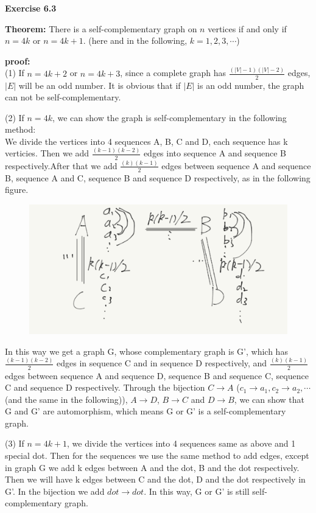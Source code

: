 \documentclass{article} %
\begin{document}
	\textbf{Exercise 6.3}\par
	\textbf{Theorem:}  There is a self-complementary graph on $n$ vertices if and only if $n=4k$ or $n=4k+1$. (here and in the following, $k=1,2,3,\cdots$)\par
	\textbf{proof:}\\
	(1)  If $n=4k+2$ or $n=4k+3$, since a complete graph has $\frac{(|V|-1)(|V|-2)}{2}$ edges, $|E|$ will be an odd number. It is obvious that if $|E|$ is an odd number, the graph can not be self-complementary.\par
	(2)  If $n=4k$, we can show the graph is self-complementary in the following method:\\
	We divide the vertices into 4 sequences A, B, C and D, each sequence has k verticies. Then we add $\frac{(k-1)(k-2)}{2}$ edges into sequence A and sequence B respectively.After that we add $\frac{(k)(k-1)}{2}$ edges between sequence A and sequence B, sequence A and C, sequence B and sequence D respectively, as in the following figure. 
	\begin{figure}[H]
		\centering
		\includegraphics[scale=0.8]{p1.png}
		\caption{}
		\label{fig:4}
	\end{figure}

	In this way we get a graph G, whose complementary graph is G', which has $\frac{(k-1)(k-2)}{2}$ edges in sequence C and in sequence D respectively, and $\frac{(k)(k-1)}{2}$ edges between sequence A and sequence D, sequence B and sequence C, sequence C and sequence D respectively. Through the bijection $C\rightarrow A$ ($c_1\rightarrow a_1, c_2\rightarrow a_2,\cdots$ (and the same in the following)), $A\rightarrow D$, $B\rightarrow C$ and $D\rightarrow B$, we can show that G and G' are automorphism, which means G or G' is a self-complementary graph.\par
	(3)  If $n=4k+1$, we divide the vertices into 4 sequences same as above and 1 special dot. Then for the sequences we use the same method to add edges, except in graph G we add k edges between A and the dot, B and the dot respectively. Then we will have k edges between C and the dot, D and the dot respectively in G'. In the bijection we add $dot \rightarrow dot$. In this way, G or G' is still self-complementary graph.
\end{document}

